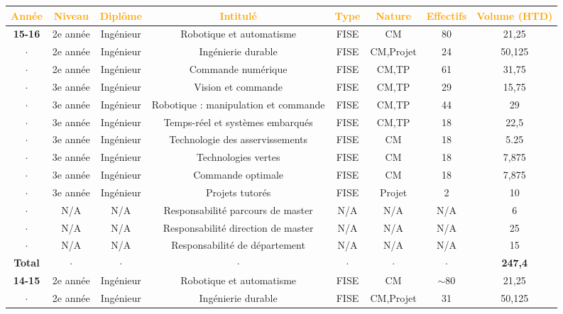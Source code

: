 \documentclass[a4paper,12pt]{article}
\begin{document}
\newpage

{\centering
\setlength{\tabcolsep}{2pt} %

\begin{tabular}{cccccccc} \toprule
    \textcolor{orange}{Année} & \textcolor{orange}{Niveau} & \textcolor{orange}{Diplôme} & \textcolor{orange}{Intitulé} & \textcolor{orange}{Type} & \textcolor{orange}{Nature} & \textcolor{orange}{Effectifs} & \textcolor{orange}{Volume (HTD)} \\ \midrule
  \bf{15-16} & 2e année  & Ingénieur & Robotique et automatisme & FISE & CM & 80 & 21,25 \\
 $\cdot$ & 2e année  & Ingénieur & Ingénierie durable  & FISE & CM,Projet & 24  & 50,125  \\
  $\cdot$ & 2e année  & Ingénieur & Commande numérique  & FISE & CM,TP & 61  & 31,75  \\
  $\cdot$ & 3e année  & Ingénieur & Vision et commande & FISE & CM,TP & 29 & 15,75  \\
  $\cdot$ & 3e année  & Ingénieur & Robotique : manipulation et commande & FISE & CM,TP & 44 & 29  \\
  $\cdot$ & 3e année  & Ingénieur & Temps-réel et systèmes embarqués & FISE & CM,TP & 18 & 22,5  \\
  $\cdot$ & 3e année  & Ingénieur & Technologie des asservissements & FISE & CM & 18 & 5.25  \\
  $\cdot$ & 3e année  & Ingénieur & Technologies vertes & FISE & CM & 18 & 7,875  \\
  $\cdot$ & 3e année  & Ingénieur & Commande optimale & FISE & CM & 18 & 7,875  \\
  $\cdot$ & 3e année  & Ingénieur & Projets tutorés & FISE & Projet & 2 & 10  \\
  $\cdot$ & N/A       & N/A       & Responsabilité parcours de master & N/A & N/A & N/A & 6  \\
  $\cdot$ & N/A       & N/A       & Responsabilité direction de master & N/A & N/A & N/A & 25  \\
  $\cdot$ & N/A       & N/A       & Responsabilité de département & N/A & N/A & N/A & 15  \\
 \bf{Total} & $\cdot$ & $\cdot$ & $\cdot$ & $\cdot$ & $\cdot$ & $\cdot$ &  {\bf 247,4} \\\midrule
  \bf{14-15} & 2e année  & Ingénieur & Robotique et automatisme & FISE & CM & \(\sim \)80 & 21,25 \\
 $\cdot$ & 2e année  & Ingénieur & Ingénierie durable  & FISE & CM,Projet & 31  & 50,125  \\

\end{tabular}}
\end{document}
